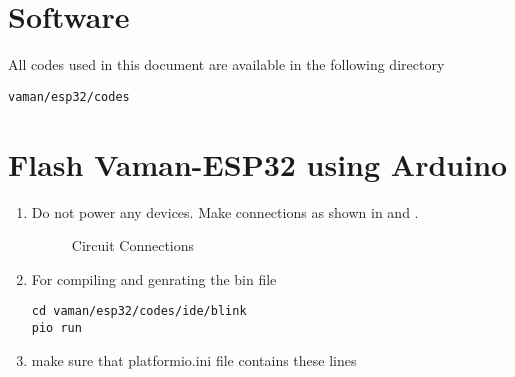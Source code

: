 \documentclass[12pt]{article}
\begin{document}
\fi

\section{Software}
%
All codes used in this document are available in the following directory 
\begin{lstlisting}
vaman/esp32/codes
\end{lstlisting}
\section{Flash Vaman-ESP32 using Arduino}

\renewcommand{\theequation}{\theenumi}
\renewcommand{\thefigure}{\theenumi}
\begin{enumerate}[label=\thesection.\arabic*.,ref=\thesection.\theenumi]
\item Do not power any devices.  Make connections as shown in  and 
.
			\begin{table}[!h]
		
		\caption{}
		\label{tab:vaman/uart/rpi-vaman-uart}
	\end{table}
\begin{figure}
\centering

\caption{Circuit Connections}
\label{fig:vaman/uart/1}
\end{figure}
\iffalse
\item Modify your platformio.ini file by adding the lines
\begin{lstlisting}
upload_protocol = esptool
upload_port = /dev/ttyACM0
upload_speed = 115200
\end{lstlisting}
\fi
\item For compiling and genrating the bin file 
\begin{lstlisting}
cd vaman/esp32/codes/ide/blink
pio run
\end{lstlisting}
\item make sure that platformio.ini file contains these lines
\begin{lstlisting}

\end{lstlisting}
\end{enumerate}
\end{document}
